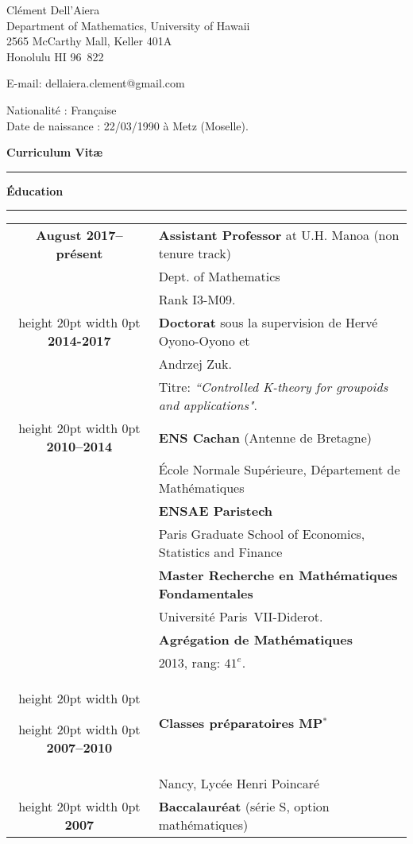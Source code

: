 \documentclass[a4paper,11pt]{article}
\newcommand\espace{\vrule height 20pt width 0pt}
\newcommand{\titre}[1]{%
	\begin{center}
	\bigskip
	\rule{\textwidth}{1pt}
	\par\vspace{0.1cm}
        \textbf{\large #1}
	\par\rule{\textwidth}{1pt}
	\end{center}
	\bigskip
	}
\begin{document}
\begin{flushleft}
Clément Dell'Aiera \\
Department of Mathematics, University of Hawaii\\
2565 McCarthy Mall, Keller 401A \\
Honolulu HI 96\ 822 \\

\medskip

E-mail: dellaiera.clement@gmail.com


\end{flushleft}
\begin{flushleft}
Nationalit\'e : Fran\c{c}aise \\
Date de naissance : 22/03/1990 \`a Metz (Moselle).
\end{flushleft}

\vspace{1.5cm}
\begin{center}
\par\huge{\textbf{Curriculum Vit\ae} }
\end{center}

\titre{\'Education}

\begin{tabular}{cp{}}

\textbf{August 2017--pr\'esent} &  \textbf{Assistant Professor} at U.H. Manoa (non tenure track) \\
						& Dept. of Mathematics\\
						& Rank I3-M09. \\ 
\espace
\textbf{2014-2017} &  \textbf{Doctorat} sous la supervision de Hervé  Oyono-Oyono et\\ 
						& Andrzej Zuk.\\
						& Titre: \textit{``Controlled K-theory for groupoids and applications"}. \\
\espace
\textbf{2010--2014} &  \textbf{ENS Cachan} (Antenne de Bretagne) \\
				    & 	\'Ecole Normale Supérieure, D\'epartement de Math\'ematiques \\
                              & \textbf{ENSAE Paristech}\\
				   & Paris Graduate School of Economics, Statistics and Finance\\
                                   & \textbf{Master Recherche en Math\'ematiques Fondamentales}\\  & Universit\'e Paris~VII-Diderot. \\
                                   & \textbf{Agrégation de Mathématiques} \\
				& 2013, rang: $41^e$. \\
\espace

\espace
\textbf{2007--2010} &\textbf{Classes préparatoires MP$^*$ } \\
					& Nancy, Lycée Henri Poincaré\\

\espace
\textbf{2007} & \textbf{Baccalauréat} (série S, option math\'ematiques) 
 \\

\end{tabular}
\end{document}
